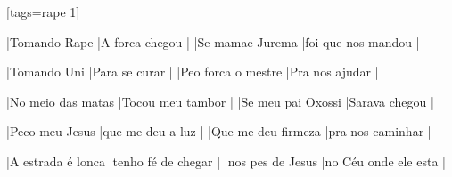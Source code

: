 [tags={rape 1}]

  \beginverse
  |Tomando Rape |A forca chegou |
  |Se mamae Jurema |foi que nos mandou |
  \endverse
  
  \beginverse
  |Tomando Uni |Para se curar |
  |Pe{\cc}o forca o mestre |Pra nos ajudar | 
  \endverse

  \beginverse
  |No meio das matas |Tocou meu tambor |
  |Se meu pai Oxossi |Sarava chegou |
  \endverse

  \beginverse
  |Peco meu Jesus |que me deu a luz |
  |Que me deu firmeza |pra nos caminhar |
  \endverse

  \beginverse
  |A estrada é lonca |tenho fé de chegar |
  |nos pes de Jesus |no Céu onde ele esta |
  \endverse    
  
\endsong
